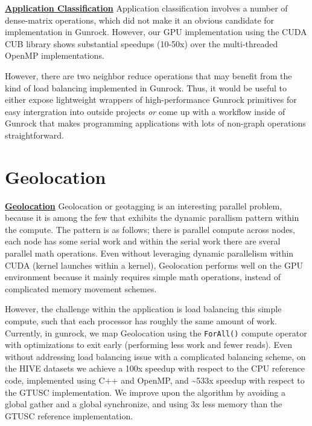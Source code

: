 \documentclass[10pt,oneside]{memoir}
\begin{document}
\textbf{\href{https://gunrock.github.io/docs/hive_application_classification.html}{Application
Classification}} Application classification involves a number of
dense-matrix operations, which did not make it an obvious candidate for
implementation in Gunrock. However, our GPU implementation using the
CUDA CUB library shows substantial speedups (10-50x) over the
multi-threaded OpenMP implementations.

However, there are two neighbor reduce operations that may benefit from
the kind of load balancing implemented in Gunrock. Thus, it would be
useful to either expose lightweight wrappers of high-performance Gunrock
primitives for easy intergration into outside projects \emph{or} come up
with a workflow inside of Gunrock that makes programming applications
with lots of non-graph operations straightforward.

\hypertarget{geolocation}{%
\section{Geolocation}\label{geolocation}}

\textbf{\href{https://gunrock.github.io/docs/hive_geolocation.html}{Geolocation}}
Geolocation or geotagging is an interesting parallel problem, because it
is among the few that exhibits the dynamic parallism pattern within the
compute. The pattern is as follows; there is parallel compute across
nodes, each node has some serial work and within the serial work there
are sveral parallel math operations. Even without leveraging dynamic
parallelism within CUDA (kernel launches within a kernel), Geolocation
performs well on the GPU environment because it mainly requires simple
math operations, instead of complicated memory movement schemes.

However, the challenge within the application is load balancing this
simple compute, such that each processor has roughly the same amount of
work. Currently, in gunrock, we map Geolocation using the
\texttt{ForAll()} compute operator with optimizations to exit early
(performing less work and fewer reads). Even without addressing load
balancing issue with a complicated balancing scheme, on the HIVE
datasets we achieve a 100x speedup with respect to the CPU reference
code, implemented using C++ and OpenMP, and \textasciitilde{}533x
speedup with respect to the GTUSC implementation. We improve upon the
algorithm by avoiding a global gather and a global synchronize, and
using 3x less memory than the GTUSC reference implementation.
\end{document}
